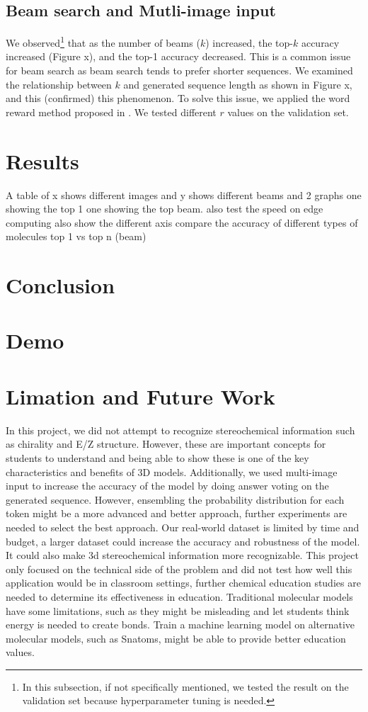 \documentclass[conference]{IEEEtran}
\begin{document}
\subsection{Beam search and Mutli-image input}


We observed\footnote{In this subsection, if not specifically mentioned, we tested the result on the validation set because hyperparameter tuning is needed.} that as the number of beams ($k$) increased, the top-$k$ accuracy increased (Figure x), and the top-1 accuracy decreased. This is a common issue for beam search as beam search tends to prefer shorter sequences. \cite{yang_breaking_2018} We examined the relationship between $k$ and generated sequence length as shown in Figure x, and this (confirmed) this phenomenon. To solve this issue, we applied the word reward method proposed in \cite{he_improved_2016}. We tested different $r$ values on the validation set. 
\section{Results}
A table of x shows different images and y shows different beams and 2 graphs one showing the top 1 one showing the top beam.  
also test the speed on edge computing also show the different axis
compare the accuracy of different types of molecules
top 1 vs top n (beam)
\section{Conclusion}
\section{Demo}
\section{Limation and Future Work}
In this project, we did not attempt to recognize stereochemical information such as chirality and E/Z structure. However, these are important concepts for students to understand and being able to show these is one of the key characteristics and benefits of 3D models. 
Additionally, we used multi-image input to increase the accuracy of the model by doing answer voting on the generated sequence. However, ensembling the probability distribution for each token might be a more advanced and better approach, further experiments are needed to select the best approach.
Our real-world dataset is limited by time and budget, a larger dataset could increase the accuracy and robustness of the model. It could also make 3d stereochemical information more recognizable.
This project only focused on the technical side of the problem and did not test how well this application would be in classroom settings, further chemical education studies are needed to determine its effectiveness in education. 
Traditional molecular models have some limitations, such as they might be misleading and let students think energy is needed to create bonds\cite{snatoms}. Train a machine learning model on alternative molecular models, such as Snatoms\cite{snatoms}, might be able to provide better education values.
\end{document}
